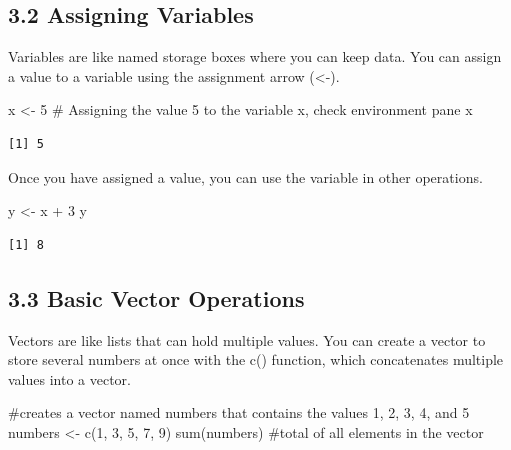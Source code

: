 \documentclass[
  letterpaper,
  DIV=11,
  numbers=noendperiod]{scrreprt}
\newenvironment{Shaded}{\begin{snugshade}}{\end{snugshade}}
\newcommand{\CommentTok}[1]{\textcolor[rgb]{0.37,0.37,0.37}{#1}}
\newcommand{\DecValTok}[1]{\textcolor[rgb]{0.68,0.00,0.00}{#1}}
\newcommand{\FunctionTok}[1]{\textcolor[rgb]{0.28,0.35,0.67}{#1}}
\newcommand{\NormalTok}[1]{\textcolor[rgb]{0.00,0.23,0.31}{#1}}
\newcommand{\OtherTok}[1]{\textcolor[rgb]{0.00,0.23,0.31}{#1}}
\newcommand{\SpecialCharTok}[1]{\textcolor[rgb]{0.37,0.37,0.37}{#1}}
\begin{document}
\subsection*{3.2 Assigning Variables}\label{assigning-variables}

Variables are like named storage boxes where you can keep data. You can
assign a value to a variable using the assignment arrow (\textless-).

\begin{Shaded}
\begin{Highlighting}[]
\NormalTok{x }\OtherTok{\textless{}{-}} \DecValTok{5} \CommentTok{\# Assigning the value 5 to the variable x, check environment pane }
\NormalTok{x }
\end{Highlighting}
\end{Shaded}

\begin{verbatim}
[1] 5
\end{verbatim}

Once you have assigned a value, you can use the variable in other
operations.

\begin{Shaded}
\begin{Highlighting}[]
\NormalTok{y }\OtherTok{\textless{}{-}}\NormalTok{ x }\SpecialCharTok{+} \DecValTok{3} 
\NormalTok{y }
\end{Highlighting}
\end{Shaded}

\begin{verbatim}
[1] 8
\end{verbatim}

\subsection*{3.3 Basic Vector Operations}\label{basic-vector-operations}

Vectors are like lists that can hold multiple values. You can create a
vector to store several numbers at once with the c() function, which
concatenates multiple values into a vector.

\begin{Shaded}
\begin{Highlighting}[]
\CommentTok{\#creates a vector named numbers that contains the values 1, 2, 3, 4, and 5 }
\NormalTok{numbers }\OtherTok{\textless{}{-}} \FunctionTok{c}\NormalTok{(}\DecValTok{1}\NormalTok{, }\DecValTok{3}\NormalTok{, }\DecValTok{5}\NormalTok{, }\DecValTok{7}\NormalTok{, }\DecValTok{9}\NormalTok{)  }
\FunctionTok{sum}\NormalTok{(numbers) }\CommentTok{\#total of all elements in the vector}
\end{Highlighting}
\end{Shaded}
\end{document}
